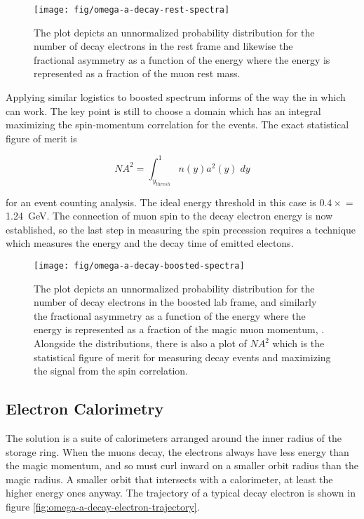 \begin{figure}
\label{fig:omega-a-decay-rest-spectra}
\texttt{[image: fig/omega-a-decay-rest-spectra]}
\caption{The plot depicts an unnormalized probability distribution for the number of decay electrons in the rest frame and likewise the fractional asymmetry as a function of the energy where the energy is represented as a fraction of the muon rest mass. }
\end{figure}

Applying similar logistics to boosted spectrum informs of the way the in which \gmtwo can work.  The key point is still to choose a domain which has an integral maximizing the spin-momentum correlation for the events.  The exact statistical figure of merit is 

\begin{equation}
\label{eqn:expt-figure-of-merit}
NA^2 = \int_{y_{thresh}}^{1} n(y) a^2(y) \;dy
\end{equation}

for an event counting analysis.  The ideal energy threshold in this case is $0.4\times$\pmagic$ = $ \SI{1.24}{\GeV}.  The connection of muon spin to the decay electron energy is now established, so the last step in measuring the spin precession requires a technique which measures the energy and the decay time of emitted electons.\cite{e821-prd}

\begin{figure}
\label{fig:omega-a-decay-boosted-spectra}
\texttt{[image: fig/omega-a-decay-boosted-spectra]}
\caption{The plot depicts an unnormalized probability distribution for the number of decay electrons in the boosted lab frame, and similarly the fractional asymmetry as a function of the energy where the energy is represented as a fraction of the magic muon momentum, \pmagic. Alongside the distributions, there is also a plot of $NA^2$ which is the statistical figure of merit for measuring decay events and maximizing the signal from the spin correlation.}
\end{figure}

\subsection{Electron Calorimetry}

The solution is a suite of calorimeters arranged around the inner radius of the storage ring.  When the muons decay, the electrons always have less energy than the magic momentum, and so must curl inward on a smaller orbit radius than the magic radius.  A smaller orbit that intersects with a calorimeter, at least the higher energy ones anyway. The trajectory of a typical decay electron is shown in figure \ref{fig:omega-a-decay-electron-trajectory}.

